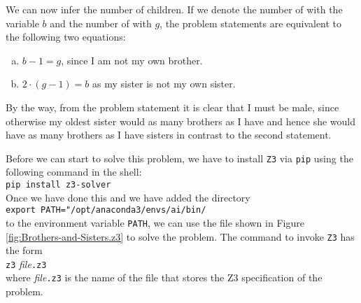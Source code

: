 We can now infer the number of children.
If we denote the number of  with the variable $b$ and the number of  with
$g$, the problem statements are equivalent to the following two equations:
\begin{enumerate}[(a)]
\item $b - 1 = g$, \quad since I am not my own brother.
\item $2 \cdot (g - 1) = b$ \quad as my sister is not my own sister.
\end{enumerate}
By the way, from the problem statement it is clear that I must be male, since otherwise
my oldest sister would as many  brothers as I have and hence she would have as many brothers as I have
sisters in contrast to the second statement.

Before we can start to solve this problem, we have to install \texttt{Z3} via \texttt{pip} using the following
command in the shell:  
\\[0.2cm]
\hspace*{1.3cm}
\texttt{pip install z3-solver}
\\[0.2cm]
Once we have done this and we have added the directory
\\[0.2cm]
\hspace*{1.3cm}
\texttt{export PATH="/opt/anaconda3/envs/ai/bin/}
\\[0.2cm]
to the environment variable \texttt{PATH}, we can use the file shown in Figure
\ref{fig:Brothers-and-Sisters.z3} to solve the problem.  The command to invoke \texttt{Z3} has the form
\\[0.2cm]
\hspace*{1.3cm}
\texttt{z3} \textsl{file}\texttt{.z3}
\\[0.2cm]
where \textsl{file}\texttt{.z3} is the name of the file that stores the Z3 specification of the problem.

